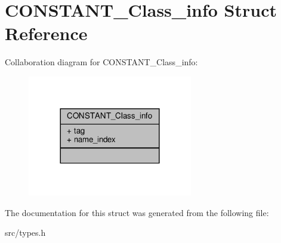 \hypertarget{structCONSTANT__Class__info}{}\section{C\+O\+N\+S\+T\+A\+N\+T\+\_\+\+Class\+\_\+info Struct Reference}
\label{structCONSTANT__Class__info}


Collaboration diagram for C\+O\+N\+S\+T\+A\+N\+T\+\_\+\+Class\+\_\+info\+:\nopagebreak
\begin{figure}[H]
\begin{center}
\leavevmode
\includegraphics[width=204pt]{structCONSTANT__Class__info__coll__graph}
\end{center}
\end{figure}


The documentation for this struct was generated from the following file\+:\begin{DoxyCompactItemize}
\item 
src/types.\+h\end{DoxyCompactItemize}
